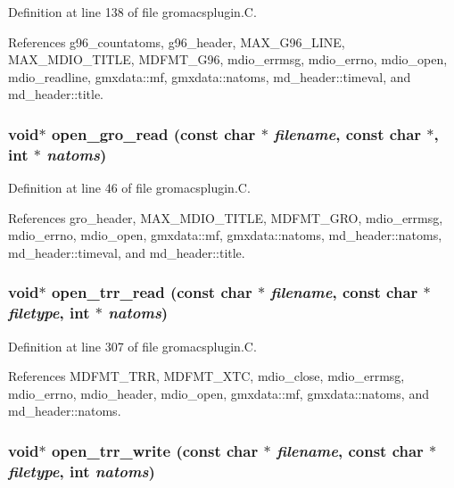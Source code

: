 Definition at line 138 of file gromacsplugin.C.

References g96\_\-countatoms, g96\_\-header, MAX\_\-G96\_\-LINE, MAX\_\-MDIO\_\-TITLE, MDFMT\_\-G96, mdio\_\-errmsg, mdio\_\-errno, mdio\_\-open, mdio\_\-readline, gmxdata::mf, gmxdata::natoms, md\_\-header::timeval, and md\_\-header::title.
\subsubsection{\setlength{\rightskip}{0pt plus 5cm}void$\ast$ open\_\-gro\_\-read (const char $\ast$ {\em filename}, const char $\ast$, int $\ast$ {\em natoms})\hspace{0.3cm}{\tt  [static]}}\label{gromacsplugin_8C_a7}




Definition at line 46 of file gromacsplugin.C.

References gro\_\-header, MAX\_\-MDIO\_\-TITLE, MDFMT\_\-GRO, mdio\_\-errmsg, mdio\_\-errno, mdio\_\-open, gmxdata::mf, gmxdata::natoms, md\_\-header::natoms, md\_\-header::timeval, and md\_\-header::title.
\subsubsection{\setlength{\rightskip}{0pt plus 5cm}void$\ast$ open\_\-trr\_\-read (const char $\ast$ {\em filename}, const char $\ast$ {\em filetype}, int $\ast$ {\em natoms})\hspace{0.3cm}{\tt  [static]}}\label{gromacsplugin_8C_a15}




Definition at line 307 of file gromacsplugin.C.

References MDFMT\_\-TRR, MDFMT\_\-XTC, mdio\_\-close, mdio\_\-errmsg, mdio\_\-errno, mdio\_\-header, mdio\_\-open, gmxdata::mf, gmxdata::natoms, and md\_\-header::natoms.
\subsubsection{\setlength{\rightskip}{0pt plus 5cm}void$\ast$ open\_\-trr\_\-write (const char $\ast$ {\em filename}, const char $\ast$ {\em filetype}, int {\em natoms})\hspace{0.3cm}{\tt  [static]}}\label{gromacsplugin_8C_a18}




